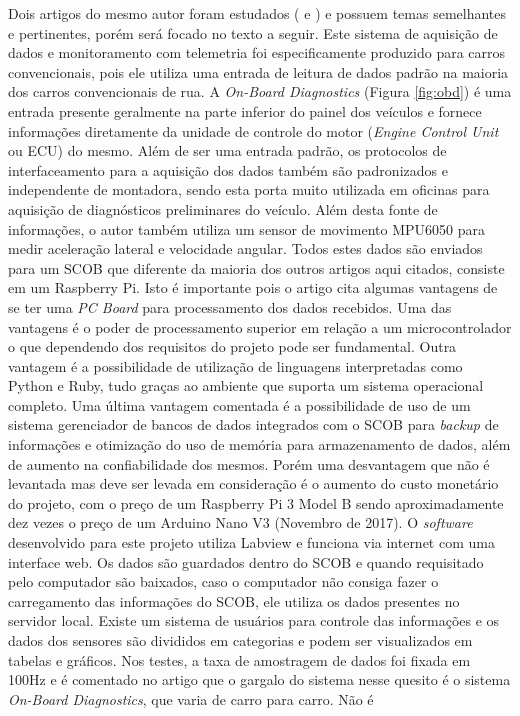 
Dois artigos do mesmo autor foram estudados (\cite{designAndImplementation2015} e \cite{developmentOfAn2016}) e possuem temas semelhantes e pertinentes, porém  será focado no texto a seguir.
Este sistema de aquisição de dados e monitoramento com telemetria foi especificamente produzido para carros convencionais, pois ele utiliza uma entrada de leitura de dados padrão na maioria dos carros convencionais de rua. A \textit{On-Board Diagnostics} (Figura \ref{fig:obd}) é uma entrada presente geralmente na parte inferior do painel dos veículos e fornece informações diretamente da unidade de controle do motor (\textit{Engine Control Unit} ou ECU) do mesmo. Além de ser uma entrada padrão, os protocolos de interfaceamento para a aquisição dos dados também são padronizados e independente de montadora, sendo esta porta muito utilizada em oficinas para aquisição de diagnósticos preliminares do veículo. Além desta fonte de informações, o autor também utiliza um sensor de movimento MPU6050 para medir aceleração lateral e velocidade angular. Todos estes dados são enviados para um SCOB que diferente da maioria dos outros artigos aqui citados, consiste em um Raspberry Pi. Isto é importante pois o artigo cita algumas vantagens de se ter uma \textit{PC Board} para processamento dos dados recebidos. Uma das vantagens é o poder de processamento superior em relação a um microcontrolador o que dependendo dos requisitos do projeto pode ser fundamental. Outra vantagem é a possibilidade de utilização de linguagens interpretadas como Python e Ruby, tudo graças ao ambiente que suporta um sistema operacional completo. Uma última vantagem comentada é a possibilidade de uso de um sistema gerenciador de bancos de dados integrados com o SCOB para \textit{backup} de informações e otimização do uso de memória para armazenamento de dados, além de aumento na confiabilidade dos mesmos. Porém uma desvantagem que não é levantada mas deve ser levada em consideração é o aumento do custo monetário do projeto, com o preço de um Raspberry Pi 3 Model B sendo aproximadamente dez vezes o preço de um Arduino Nano V3 (Novembro de 2017). O \textit{software} desenvolvido para este projeto utiliza Labview e funciona via internet com uma interface web. Os dados são guardados dentro do SCOB e quando requisitado pelo computador são baixados, caso o computador não consiga fazer o carregamento das informações do SCOB, ele utiliza os dados presentes no servidor local. Existe um sistema de usuários para controle das informações e os dados dos sensores são divididos em categorias e podem ser visualizados em tabelas e gráficos. Nos testes, a taxa de amostragem de dados foi fixada em 100Hz e é comentado no artigo que o gargalo do sistema nesse quesito é o sistema \textit{On-Board Diagnostics}, que varia de carro para carro. Não é 
